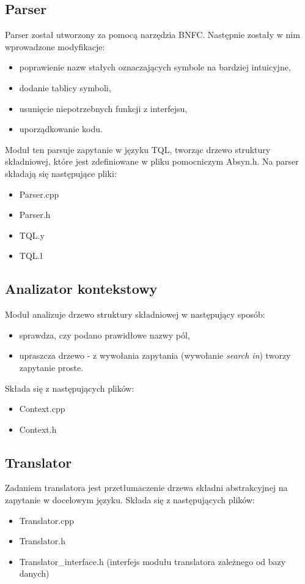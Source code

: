 \subsection{Parser}
Parser został utworzony za pomocą narzędzia BNFC. Następnie zostały w nim wprowadzone modyfikacje:
\begin{itemize}
\item poprawienie nazw stałych oznaczających symbole na bardziej intuicyjne,
\item dodanie tablicy symboli,
\item usunięcie niepotrzebnych funkcji z interfejsu,
\item uporządkowanie kodu.
\end{itemize}
Moduł ten parsuje zapytanie w języku TQL, tworząc drzewo struktury składniowej, które jest zdefiniowane w pliku pomocniczym Absyn.h.
Na parser składają się następujące pliki:
\begin{itemize}
 \item Parser.cpp
 \item Parser.h
 \item TQL.y %
 \item TQL.l %
\end{itemize}

\subsection{Analizator kontekstowy}
Moduł analizuje drzewo struktury składniowej w następujący sposób:
\begin{itemize}
 \item sprawdza, czy podano prawidłowe nazwy pól,  %
\item upraszcza drzewo - z wywołania zapytania (wywołanie \textit{search in}) tworzy zapytanie proste.
\end{itemize}
Składa się z następujących plików:
\begin{itemize}
 \item Context.cpp
 \item Context.h
\end{itemize}

\subsection{Translator}
Zadaniem translatora jest przetłumaczenie drzewa składni abstrakcyjnej na zapytanie w docelowym języku. 
Składa się z następujących plików:
\begin {itemize}
 \item Translator.cpp
 \item Translator.h
 \item Translator\_interface.h (interfejs modułu translatora zależnego od bazy danych)
\end {itemize}

